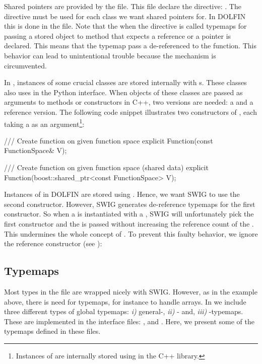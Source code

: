 Shared pointers are provided by the  file.
This file declare the directive: . The directive
must be used for each class we want shared pointers for. In DOLFIN
this is done in the  file. Note that the
when the directive is called typemaps for passing a 
stored object to method that expects a reference or a pointer is
declared. This means that the typemap pass a de-referenced
 to the function. This behavior can lead to
unintentional trouble because the  mechanism is
circumvented.

In \dolfin, instances of some crucial classes are stored internally
with s. These classes also uses 
in the Python interface. When objects of these classes are passed
as arguments to methods or constructors in C++, two versions are
needed: a  and a reference version. The following
code snippet illustrates two constructors of , each
taking a  as an argument\footnote{Instances of
 are internally stored using  in
the \dolfin C++ library.}:
\begin{c++}
/// Create function on given function space
explicit Function(const FunctionSpace& V);

/// Create function on given function space (shared data)
explicit Function(boost::shared_ptr<const FunctionSpace> V);
\end{c++}
Instances of  in DOLFIN are stored
using . Hence, we want SWIG to use the second
constructor. However, SWIG generates de-reference typemaps for the
first constructor. So when a  is instantiated with a
, SWIG will unfortunately pick the first constructor
and the  is passed without increasing the reference
count of the .  This undermines the whole concept
of . To prevent this faulty behavior, we ignore the
reference constructor (see ):
\begin{swigcode}
\end{swigcode}

\subsection{Typemaps}
Most types in the  file are wrapped nicely
with SWIG. However, as in the  example above, there
is need for typemaps, for instance to handle \numpy arrays.
In  we include three different types of global
typemaps: \textit{i)} general-, \textit{ii)} \numpy- and,
\textit{iii)} -typemaps. These are implemented in the
interface files: ,  and
. Here, we present some of the
typemaps defined in these files.

